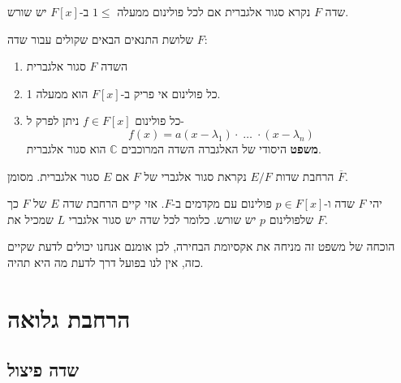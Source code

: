 \documentclass{tstextbook}
\begin{document}
\begin{definition}
שדה \(F\) נקרא סגור אלגברית אם לכל פולינום ממעלה \(1\leq\) ב-\(F[x]\) יש שורש.

\end{definition}
\begin{proposition}
שלושת התנאים הבאים שקולים עבור שדה \(F\):

  \begin{enumerate}
    \item השדה \(F\) סגור אלגברית 


    \item כל פולינום אי פריק ב-\(F[x]\) הוא ממעלה 1. 


    \item כל פולינום \(f \in F[x]\) ניתן לפרק ל- 
$$f(x)=a\left( x-\lambda_{1} \right)\cdot\;\!\dots\;\!\cdot\left( x-\lambda_{n} \right)$$\textbf{משפט} היסודי של האלגברה
השדה המרוכבים \(\mathbb{C}\) הוא סגור אלגברית.


  \end{enumerate}
\end{proposition}
\begin{definition}
הרחבת שדות \(E / F\) נקראת סגור אלגברי של \(F\) אם \(E\) סגור אלגברית. מסומן \(\overline{F}\).

\end{definition}
\begin{theorem}
יהי \(F\) שדה ו-\(p \in F[x]\) פולינום עם מקדמים ב-\(F\). אזי קיים הרחבת שדה \(E\) של \(F\) כך שלפולינום \(p\) יש שורש. כלומר לכל שדה יש סגור אלגברי \(L\) שמכיל את \(F\).

\end{theorem}
\begin{remark}
הוכחה של משפט זה מניחה את אקסיומת הבחירה, לכן אומנם אנחנו יכולים לדעת שקיים כזה, אין לנו בפועל דרך לדעת מה היא תהיה.

\end{remark}
\chapter{הרחבת גלואה}

\section{שדה פיצול}
\end{document}
